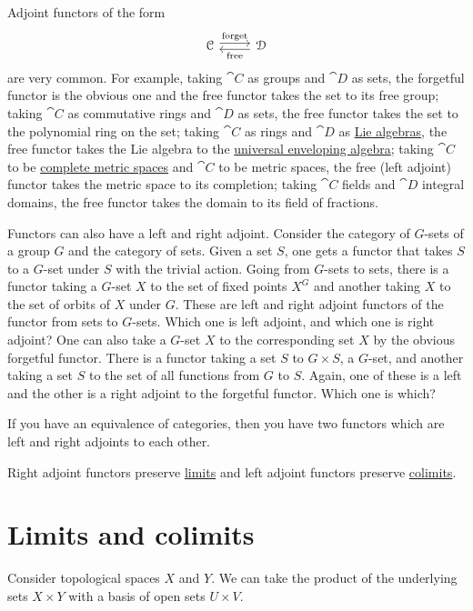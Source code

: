 \documentclass[11pt, oneside]{article}
\begin{document}
Adjoint functors of the form
\[
\begin{tikzcd}
\cat C \arrow[r, shift left, "\mathrm{forget}"]& \cat D\arrow[l, shift left, "\mathrm{free}"]
\end{tikzcd}
\]
are very common. For example, taking $\cat C$ as groups and $\cat D$ as sets, the forgetful functor is the obvious one and the free functor takes the set to its free group; taking $\cat C$ as commutative rings and $\cat D$ as sets, the free functor takes the set to the polynomial ring on the set; taking $\cat C$ as rings and $\cat D$ as \href{https://en.wikipedia.org/wiki/Lie_algebra}{\color{black}Lie algebras}, the free functor takes the Lie algebra to the \href{https://en.wikipedia.org/wiki/Universal_enveloping_algebra}{\color{black}universal enveloping algebra}; taking $\cat C$ to be \href{https://en.wikipedia.org/wiki/Complete_metric_space}{\color{black}complete metric spaces} and $\cat C$ to be metric spaces, the free (left adjoint) functor takes the metric space to its completion; taking $\cat C$ fields and $\cat D$ integral domains, the free functor takes the domain to its field of fractions.

Functors can also have a left and right adjoint. Consider the category of $G$-sets of a group $G$ and the category of sets. Given a set $S$, one gets a functor that takes $S$ to a $G$-set under $S$ with the trivial action. Going from $G$-sets to sets, there is a functor taking a $G$-set $X$ to the set of fixed points $X^G$ and another taking $X$ to the set of orbits of $X$ under $G$. These are left and right adjoint functors of the functor from sets to $G$-sets. Which one is left adjoint, and which one is right adjoint? One can also take a $G$-set $X$ to the corresponding set $X$ by the obvious forgetful functor. There is a functor taking a set $S$ to $G\times S$, a $G$-set, and another taking a set $S$ to the set of all functions from $G$ to $S$. Again, one of these is a left and the other is a right adjoint to the forgetful functor. Which one is which?

If you have an equivalence of categories, then you have two functors which are left and right adjoints to each other.

Right adjoint functors preserve \href{https://en.wikipedia.org/wiki/Limit_(category_theory)}{\color{black}limits} and left adjoint functors preserve \href{https://en.wikipedia.org/wiki/Limit_(category_theory)}{\color{black}colimits}.



\section{Limits and colimits}
Consider topological spaces $X$ and $Y$. We can take the product of the underlying sets $X\times Y$ with a basis of open sets $U\times V$.
\end{document}
